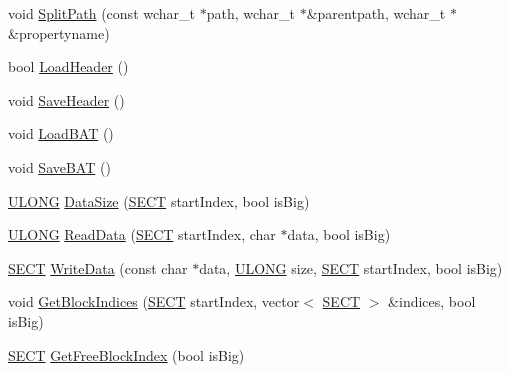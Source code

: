\begin{DoxyCompactItemize}
\item 
void \hyperlink{class_y_compound_files_1_1_compound_file_a3be81d1a73f74793e3c92cb051e2c10c}{Split\+Path} (const wchar\+\_\+t $\ast$path, wchar\+\_\+t $\ast$\&parentpath, wchar\+\_\+t $\ast$\&propertyname)
\item 
bool \hyperlink{class_y_compound_files_1_1_compound_file_a83e08fdf3c056c2b7be476e16f0f9473}{Load\+Header} ()
\item 
void \hyperlink{class_y_compound_files_1_1_compound_file_a6bf0e1aa5c8f8444632e713312a2f38f}{Save\+Header} ()
\item 
void \hyperlink{class_y_compound_files_1_1_compound_file_a77153a3607417a2fd7ef84aab9193f2e}{Load\+B\+A\+T} ()
\item 
void \hyperlink{class_y_compound_files_1_1_compound_file_a6b79426b819e667dc0ba60b4969e9625}{Save\+B\+A\+T} ()
\item 
\hyperlink{_basic_excel_8hpp_abe09d1bea023be6a07cbadde8e955435}{U\+L\+O\+N\+G} \hyperlink{class_y_compound_files_1_1_compound_file_a25ac7b658490f049a29f29eaabe777bc}{Data\+Size} (\hyperlink{_basic_excel_8hpp_a784c2e2144ab372c047faeeb0f6a9e6b}{S\+E\+C\+T} start\+Index, bool is\+Big)
\item 
\hyperlink{_basic_excel_8hpp_abe09d1bea023be6a07cbadde8e955435}{U\+L\+O\+N\+G} \hyperlink{class_y_compound_files_1_1_compound_file_a824ee7496bc9e849cbacab7860011703}{Read\+Data} (\hyperlink{_basic_excel_8hpp_a784c2e2144ab372c047faeeb0f6a9e6b}{S\+E\+C\+T} start\+Index, char $\ast$data, bool is\+Big)
\item 
\hyperlink{_basic_excel_8hpp_a784c2e2144ab372c047faeeb0f6a9e6b}{S\+E\+C\+T} \hyperlink{class_y_compound_files_1_1_compound_file_affe7d3e13bf06566b99a248fea564edd}{Write\+Data} (const char $\ast$data, \hyperlink{_basic_excel_8hpp_abe09d1bea023be6a07cbadde8e955435}{U\+L\+O\+N\+G} size, \hyperlink{_basic_excel_8hpp_a784c2e2144ab372c047faeeb0f6a9e6b}{S\+E\+C\+T} start\+Index, bool is\+Big)
\item 
void \hyperlink{class_y_compound_files_1_1_compound_file_aee1b28335f7d3dc945f58c1e3681482c}{Get\+Block\+Indices} (\hyperlink{_basic_excel_8hpp_a784c2e2144ab372c047faeeb0f6a9e6b}{S\+E\+C\+T} start\+Index, vector$<$ \hyperlink{_basic_excel_8hpp_a784c2e2144ab372c047faeeb0f6a9e6b}{S\+E\+C\+T} $>$ \&indices, bool is\+Big)
\item 
\hyperlink{_basic_excel_8hpp_a784c2e2144ab372c047faeeb0f6a9e6b}{S\+E\+C\+T} \hyperlink{class_y_compound_files_1_1_compound_file_ac0ae9f8fb054371f50055a4e47b83680}{Get\+Free\+Block\+Index} (bool is\+Big)

\end{DoxyCompactItemize}
